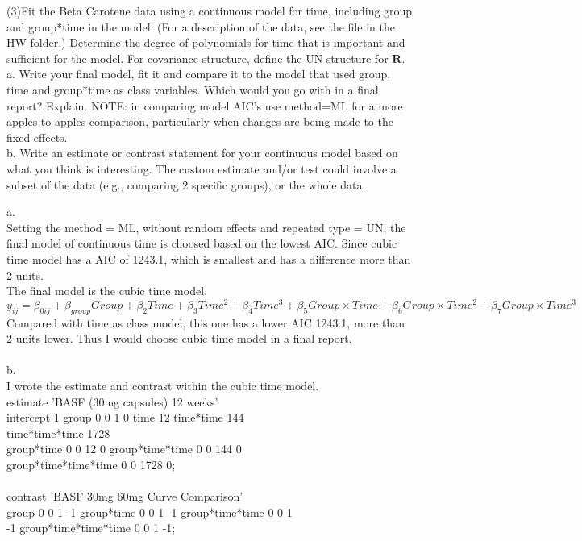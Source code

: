 \documentclass[12pt, utf8]{article}
\begin{document}
\begin{problem}
(3)Fit the Beta Carotene data using a continuous model for time, including group and group*time in the model.  (For a description of the data, see the file in the HW folder.)  Determine the degree of polynomials for time that is important and sufficient for the model.  For covariance structure, define the UN structure for $\boldsymbol{R}$.\\
  a. Write your final model, fit it and compare it to the model that used group, time and group*time as class variables.  Which would you go with in a final report?  Explain.  NOTE:  in comparing model AIC’s use method=ML for a more apples-to-apples comparison, particularly when changes are being made to the fixed effects. \\ 
  b. Write an estimate or contrast statement for your continuous model based on what you think is interesting.  The custom estimate and/or test could involve a subset of the data (e.g., comparing 2 specific groups), or the whole data.
\end{problem}
a. \\
Setting the method = ML, without random effects and repeated type = UN, the final model of continuous time is choosed based on the lowest AIC. Since cubic time model has a AIC of 1243.1, which is smallest and has a difference more than 2 units. \\ 
The final model is the cubic time model. \\
$ y_{ij} = \beta_{0ij} + \beta_{group}Group + \beta_2Time + \beta_3Time^2 + \beta_4Time^3 + \beta_5Group\times Time + \beta_6Group\times Time^2 + \beta_7Group\times Time^3$ \\
Compared with time as class model, this one has a lower AIC 1243.1, more than 2 units lower. Thus I would choose cubic time model in a final report. \\
\\
b. \\
I wrote the estimate and contrast within the cubic time model. \\
estimate 'BASF (30mg capsules) 12 weeks'\\
intercept 1 group 0 0 1 0 time 12 time*time 144\\ time*time*time 1728 \\
group*time 0 0 12 0  group*time*time 0 0 144 0\\ group*time*time*time 0 0 1728 0;\\
\\
contrast 'BASF 30mg 60mg Curve Comparison'\\
group 0 0 1 -1 group*time 0 0 1 -1  group*time*time 0 0 1\\ -1 group*time*time*time 0 0 1 -1;\\
\end{document}
